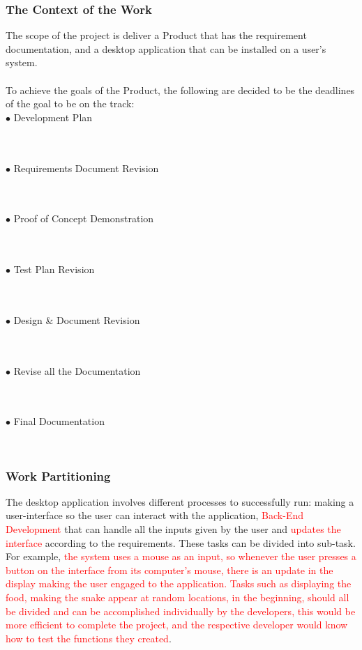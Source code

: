 \documentclass[12pt, titlepage]{article}
\begin{document}
\subsubsection{The Context of the Work}
The scope of the project is deliver a Product that has the requirement documentation, and a desktop application that can be installed on a user's system.\\
\\To achieve the goals of the Product, the following are decided to be the deadlines of the goal to be on the track:\\
$\bullet$ Development Plan \date{28/09/18}\\
\\$\bullet$ Requirements Document Revision \date{05/10/18}\\
\\$\bullet$ Proof of Concept Demonstration \date{16/10/18}\\
\\$\bullet$ Test Plan Revision \date{26/10/19}\\
\\$\bullet$ Design \& Document Revision \date{09/11/18}\\
\\$\bullet$ Revise all the Documentation \date{13/11/18}\\
\\$\bullet$ Final Documentation \date{06/12/18}\\

\subsubsection{Work Partitioning}
The desktop application involves different processes to successfully run: making a user-interface so the user can interact with the application, \textcolor{red}{Back-End Development} that can handle all the inputs given by the user and \textcolor{red}{updates the interface} according to the requirements.
These tasks can be divided into sub-task. For example, \textcolor{red}{the system uses a mouse as an input, so whenever the user presses a button on the interface from its computer's mouse, there is an update in the display making the user engaged to the application. Tasks such as displaying the food, making the snake appear at random locations, in the beginning, should all be divided and can be accomplished individually by the developers, this would be more efficient to complete the project, and the respective developer would know how to test the functions they created}.
\end{document}
